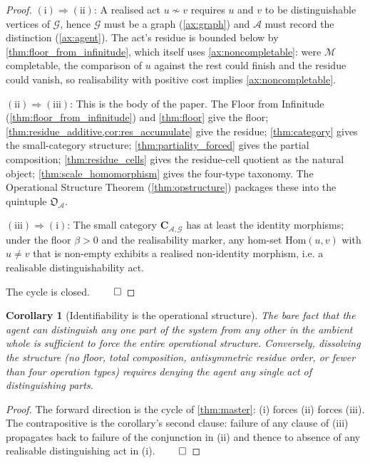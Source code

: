 \documentclass[11pt,twocolumn,a4paper]{article}
\theoremstyle{thmstyle}
\newtheorem{corollary}[theorem]{Corollary}
\theoremstyle{definition}
\theoremstyle{remark}
\newcommand{\Graph}{\mathcal{G}}
\newcommand{\Agent}{\mathcal{A}}
\newcommand{\floor}{\beta}
\newcommand{\OpStr}{\mathfrak{O}}
\begin{document}
\begin{proof}
$(\mathrm{i}) \Rightarrow (\mathrm{ii})$: A realised act
$u \not\sim v$ requires $u$ and $v$ to be distinguishable vertices
of $\Graph$, hence $\Graph$ must be a graph (\cref{ax:graph}) and
$\Agent$ must record the distinction (\cref{ax:agent}). The act's
residue is bounded below by \cref{thm:floor_from_infinitude}, which
itself uses \cref{ax:noncompletable}: were $\mathcal{M}$
completable, the comparison of $u$ against the rest could finish
and the residue could vanish, so realisability with positive cost
implies \cref{ax:noncompletable}.

$(\mathrm{ii}) \Rightarrow (\mathrm{iii})$: This is the body of the
paper. The Floor from Infinitude
(\cref{thm:floor_from_infinitude}) and \cref{thm:floor} give the
floor; \cref{thm:residue_additive,cor:res_accumulate} give the
residue; \cref{thm:category} gives the small-category structure;
\cref{thm:partiality_forced} gives the partial composition;
\cref{thm:residue_cells} gives the residue-cell quotient as the
natural object; \cref{thm:scale_homomorphism} gives the four-type
taxonomy. The Operational Structure Theorem
(\cref{thm:opstructure}) packages these into the quintuple
$\OpStr_\Agent$.

$(\mathrm{iii}) \Rightarrow (\mathrm{i})$: The small category
$\mathbf{C}_{\Agent,\Graph}$ has at least the identity morphisms;
under the floor $\floor > 0$ and the realisability marker, any
hom-set $\mathrm{Hom}(u, v)$ with $u \neq v$ that is non-empty
exhibits a realised non-identity morphism, i.e. a realisable
distinguishability act.

The cycle is closed. $\qed$
\end{proof}

\begin{corollary}[Identifiability is the operational structure]
\label{cor:identifiability_is_structure}
The bare fact that the agent can distinguish any one part of the
system from any other in the ambient whole is sufficient to force
the entire operational structure. Conversely, dissolving the
structure (no floor, total composition, antisymmetric residue
order, or fewer than four operation types) requires denying the
agent any single act of distinguishing parts.
\end{corollary}

\begin{proof}
The forward direction is the cycle of \cref{thm:master}: (i) forces
(ii) forces (iii). The contrapositive is the corollary's second
clause: failure of any clause of (iii) propagates back to failure
of the conjunction in (ii) and thence to absence of any realisable
distinguishing act in (i). $\qed$
\end{proof}
\end{document}
